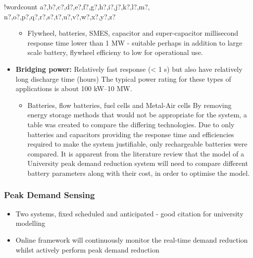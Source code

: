 \documentclass[10pt]{article}
\providecommand{\tightlist}{%
  \setlength{\itemsep}{0pt}\setlength{\parskip}{0pt}}
\newcounter{words}
\newenvironment{counted}{%
  \setcounter{words}{0}
  \SearchList!{wordcount}{\stepcounter{words}}
    {a?,b?,c?,d?,e?,f?,g?,h?,i?,j?,k?,l?,m?,
    n?,o?,p?,q?,r?,s?,t?,u?,v?,w?,x?,y?,z?}
  \UndoBoundary{'}
  \SearchOrder{p;}}{%
  \StopSearching}
\begin{document}
\begin{counted}
\begin{itemize}
  \begin{itemize}
  \tightlist
  \item
    Flywheel, batteries, SMES, capacitor and super-capacitor millisecond
    response time lower than 1 MW - suitable perhaps in addition to
    large scale battery, flywheel efficieny to low for operational use.
  \end{itemize}
\item
  \textbf{Bridging power:} Relatively fast response (\textless{} 1 s)
  but also have relatively long discharge time (hours) The typical power
  rating for these types of applications is about 100 kW--10 MW.

  \begin{itemize}
  \tightlist
  \item
    Batteries, flow batteries, fuel cells and Metal-Air cells
    \cite{Chen2009291} By removing energy storage methods that would not
    be appropriate for the system, a table was created to compare the
    differing technologies. Due to only batteries and capacitors
    providing the response time and efficiencies required to make the
    system justifiable, only rechargeable batteries were compared. It is
    apparent from the literature review that the model of a University
    peak demand reduction system will need to compare different battery
    parameters along with their cost, in order to optimise the model.
  \end{itemize}
\end{itemize}

\subsubsection{Peak Demand Sensing}\label{peak-demand-sensing}

\begin{itemize}
\tightlist
\item
  Two systems, fixed scheduled and anticipated \cite{20164002874437} -
  good citation for university modelling
\item
  Online framework will continuously monitor the real-time demand
  reduction whilst actively perform peak demand reduction


\end{itemize}
\end{counted}
\end{document}
